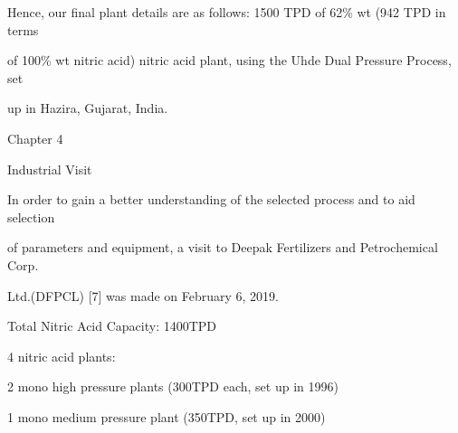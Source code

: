 \documentclass[a4paper,portrait,12pt]{article}
\begin{document}
\begin{flushleft}
Hence, our final plant details are as follows: 1500 TPD of 62\% wt (942 TPD in terms
\end{flushleft}


\begin{flushleft}
of 100\% wt nitric acid) nitric acid plant, using the Uhde Dual Pressure Process, set
\end{flushleft}


\begin{flushleft}
up in Hazira, Gujarat, India.
\end{flushleft}





\begin{flushleft}
\newpage
Chapter 4
\end{flushleft}





\begin{flushleft}
Industrial Visit
\end{flushleft}


\begin{flushleft}
In order to gain a better understanding of the selected process and to aid selection
\end{flushleft}


\begin{flushleft}
of parameters and equipment, a visit to Deepak Fertilizers and Petrochemical Corp.
\end{flushleft}


\begin{flushleft}
Ltd.(DFPCL) [7] was made on February 6, 2019.
\end{flushleft}


\begin{flushleft}
Total Nitric Acid Capacity: 1400TPD
\end{flushleft}


\begin{flushleft}
4 nitric acid plants:
\end{flushleft}


\begin{flushleft}
2 mono high pressure plants (300TPD each, set up in 1996)
\end{flushleft}


\begin{flushleft}
1 mono medium pressure plant (350TPD, set up in 2000)
\end{flushleft}
\end{document}
